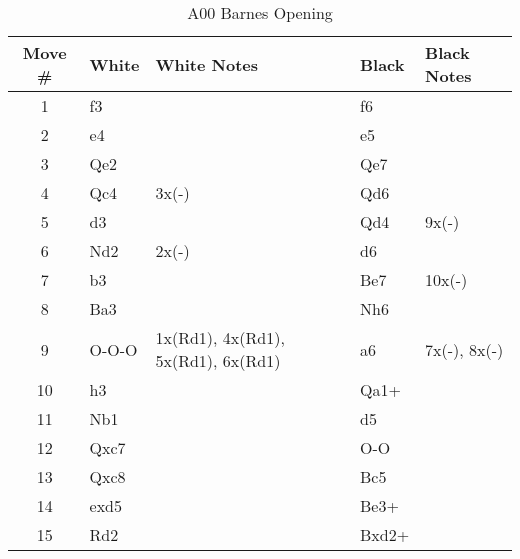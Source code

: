 \begin{table}[htbp]
\centering
\scriptsize
\caption{A00 Barnes Opening}
\begin{tabular}{|c|l|p{5cm}|l|p{5cm}|}
\hline
\textbf{Move \#} & \textbf{White} & \textbf{White Notes} & \textbf{Black} & \textbf{Black Notes} \\
\hline
1  & f3      &                   & f6      &                        \\
2  & e4      &                   & e5      &                        \\
3  & Qe2     &                   & Qe7     &                        \\
4  & Qc4     & 3x(-)             & Qd6     &                        \\
5  & d3      &                   & Qd4     & 9x(-)                  \\
6  & Nd2     & 2x(-)             & d6      &                        \\
7  & b3      &                   & Be7     & 10x(-)                 \\
8  & Ba3     &                   & Nh6     &                        \\
9  & O-O-O   & 1x(Rd1), 4x(Rd1), 5x(Rd1), 6x(Rd1) & a6      & 7x(-), 8x(-)           \\
10 & h3      &                   & Qa1+    &                        \\
11 & Nb1     &                   & d5      &                        \\
12 & Qxc7    &                   & O-O     &                        \\
13 & Qxc8    &                   & Bc5     &                        \\
14 & exd5    &                   & Be3+    &                        \\
15 & Rd2     &                   & Bxd2+   &                        \\
\hline
\end{tabular}
\end{table}
